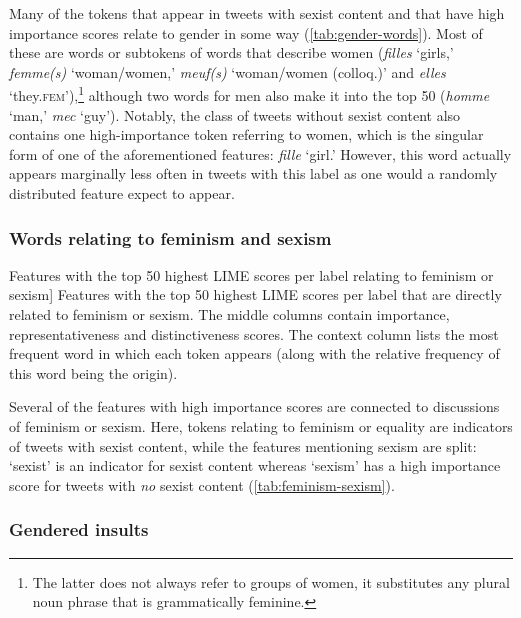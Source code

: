 Many of the tokens that appear in tweets with sexist content and that have high importance scores relate to gender in some way (\autoref{tab:gender-words}).
Most of these are words or subtokens of words that describe women (\textit{filles} `girls,' \textit{femme(s)} `woman/women,' \textit{meuf(s)} `woman/women (colloq.)' and \textit{elles} `they.\textsc{fem}'),\footnote{%
The latter does not always refer to groups of women, it substitutes any plural noun phrase that is grammatically feminine.}
although two words for men also make it into the top 50 (\textit{homme} `man,' \textit{mec} `guy').
Notably, the class of tweets without sexist content also contains one high-importance token referring to women, which is the singular form of one of the aforementioned features: \textit{fille} `girl.' 
However, this word actually appears marginally less often in tweets with this label as one would a randomly distributed feature expect to appear.

\subsubsection{Words relating to feminism and sexism}

\begin{table}[htbp]
    
    \caption
    [Features with the top 50 highest LIME scores per label relating to feminism or sexism]
    {Features with the top 50 highest LIME scores per label that are directly related to feminism or sexism.
    The middle columns contain importance, representativeness and distinctiveness scores.
    The context column lists the most frequent word in which each token appears (along with the relative frequency of this word being the origin).
    }
    \label{tab:feminism-sexism}
\end{table}

Several of the features with high importance scores are connected to discussions of feminism or sexism.
Here, tokens relating to feminism or equality are indicators of tweets with sexist content, while the features mentioning sexism are split:  `sexist' is an indicator for sexist content whereas  `sexism' has a high importance score for tweets with \textit{no} sexist content (\autoref{tab:feminism-sexism}).

\subsubsection{Gendered insults}

